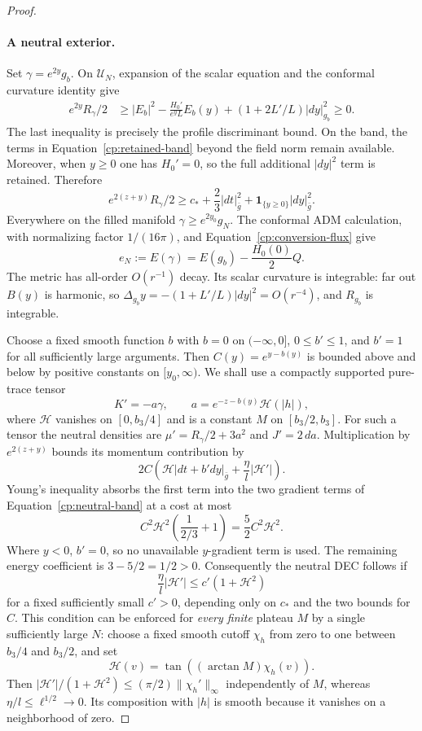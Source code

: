 \begin{proof}
\paragraph{A neutral exterior.}
Set $\gamma=e^{2y}g_b$.  On $\mathcal U_N$, expansion of the
scalar equation and the conformal curvature identity give
\begin{align*}
 e^{2y}R_\gamma/2
 &\ge |E_b|^2-
 \frac{H_0'}{e^yL}E_b(y)
       +(1+2L'/L)|dy|_{g_b}^2\ge0.
\end{align*}
The last inequality is precisely the profile discriminant bound.
On the band, the terms in Equation~\eqref{cp:retained-band}
beyond the field norm remain available.  Moreover, when $y\ge0$
one has $H_0'=0$, so the full additional $|dy|^2$ term is retained.
Therefore
\begin{equation}\label{cp:neutral-band}
 e^{2(z+y)}R_\gamma/2\ge c_*+\frac23|dt|_{\bar g}^2
             +\mathbf1_{\{y\ge0\}}|dy|_{\bar g}^2.
\end{equation}
Everywhere on the filled manifold
$\gamma\ge e^{2y_0}g_N$.  The conformal ADM calculation, with
normalizing factor $1/(16\pi)$, and
Equation~\eqref{cp:conversion-flux} give
\begin{equation}\label{cp:conversion-mass}
 e_N:=E(\gamma)=E(g_b)-\frac{H_0(0)}2Q.
\end{equation}
The metric has all-order $O(r^{-1})$ decay.  Its scalar curvature
is integrable: far out $B(y)$ is harmonic, so
$\Delta_{g_b}y=-(1+L'/L)|dy|^2=O(r^{-4})$, and $R_{g_b}$ is
integrable.

Choose a fixed smooth function $b$ with $b=0$ on $(-\infty,0]$,
$0\le b'\le1$, and $b'=1$ for all sufficiently large arguments.
Then $C(y)=e^{y-b(y)}$ is bounded above and below by positive
constants on $[y_0,\infty)$.  We shall use a compactly supported
pure-trace tensor
\[
 K'=-a\gamma,\qquad
 a=e^{-z-b(y)}\mathcal H(|h|),
\]
where $\mathcal H$ vanishes on $[0,b_3/4]$ and is a constant $M$
on $[b_3/2,b_3]$.  For such a tensor the neutral densities are
$\mu'=R_\gamma/2+3a^2$ and $J'=2\,da$.
Multiplication by $e^{2(z+y)}$ bounds its momentum contribution by
\[
 2C\left(\mathcal H|dt+b'dy|_{\bar g}
             +\frac\eta l|\mathcal H'|\right).
\]
Young's inequality absorbs the first term into the two gradient
terms of Equation~\eqref{cp:neutral-band} at a cost at most
\[
 C^2\mathcal H^2\left(\frac{1}{2/3}+1\right)
       =\frac52C^2\mathcal H^2.
\]
Where $y<0$, $b'=0$, so no unavailable $y$-gradient term is used.
The remaining energy coefficient is $3-5/2=1/2>0$.
Consequently the neutral DEC follows if
\[
 \frac\eta l|\mathcal H'|\le c'(1+\mathcal H^2)
\]
for a fixed sufficiently small $c'>0$, depending only on $c_*$
and the two bounds for $C$.  This condition can be enforced for
\emph{every finite} plateau $M$ by a single sufficiently large $N$:
choose a fixed smooth cutoff $\chi_h$ from zero to one between
$b_3/4$ and $b_3/2$, and set
\[
 \mathcal H(v)=\tan((\arctan M)\chi_h(v)).
\]
Then $|\mathcal H'|/(1+\mathcal H^2)\le
(\pi/2)\|\chi_h'\|_\infty$ independently of $M$, whereas
$\eta/l\le\ell^{1/2}\to0$.  Its composition with $|h|$ is smooth
because it vanishes on a neighborhood of zero.


\end{proof}
